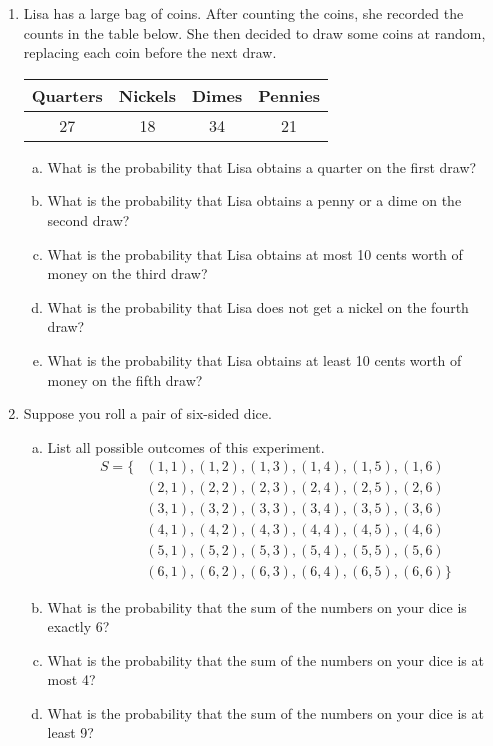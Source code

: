 \begin{enumerate}
\item Lisa has a large bag of coins. After counting the coins, she recorded the counts in the table below. She then decided to draw some coins at random, replacing each coin before the next draw.
\begin{center}
\begin{tabular}{c c c c}
\textbf{Quarters} & \textbf{Nickels} & \textbf{Dimes} & \textbf{Pennies} \\
\hline 
27 & 18 & 34 & 21
\end{tabular}
\end{center}
\begin{enumerate}[(a)]
\item What is the probability that Lisa obtains a quarter on the first draw? 
\item What is the probability that Lisa obtains a penny or a dime on the second draw? 
\item What is the probability that Lisa obtains at most 10 cents worth of money on the third draw? 
\item What is the probability that Lisa does not get a nickel on the fourth draw? 
\item What is the probability that Lisa obtains at least 10 cents worth of money on the fifth draw? 
\end{enumerate}
		
\item Suppose you roll a pair of six-sided dice. 
\begin{enumerate}[(a)]
\item List all possible outcomes of this experiment. 
\begin{align*}
S = \{&(1,1), (1,2), (1,3), (1,4), (1,5), (1,6)\\
&(2,1), (2,2), (2,3), (2,4), (2,5), (2,6)\\
&(3,1), (3,2), (3,3), (3,4), (3,5), (3,6)\\
&(4,1), (4,2), (4,3), (4,4), (4,5), (4,6)\\
&(5,1), (5,2), (5,3), (5,4), (5,5), (5,6)\\
&(6,1), (6,2), (6,3), (6,4), (6,5), (6,6)\}
\end{align*}
\item What is the probability that the sum of the numbers on your dice is exactly 6? 
\item What is the probability that the sum of the numbers on your dice is at most 4? 
\item What is the probability that the sum of the numbers on your dice is at least 9? 
\end{enumerate}
\pagebreak


\end{enumerate}
